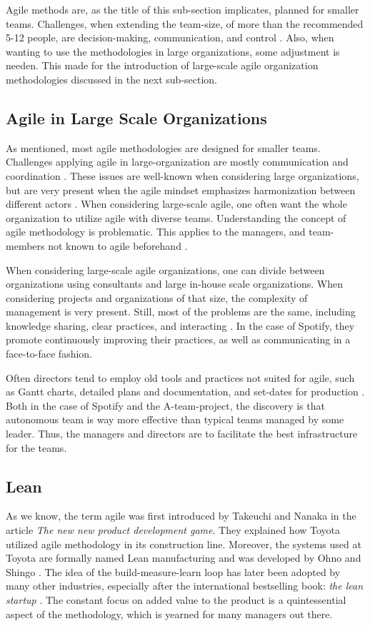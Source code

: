 Agile methods are, as the title of this sub-section implicates, planned for smaller teams. Challenges, when extending the team-size, of more than the recommended 5-12 people, are decision-making, communication, and control \cite{xu2009coordination}. Also, when wanting to use the methodologies in large organizations, some adjustment is needen. This made for the introduction of large-scale agile organization methodologies discussed in the next sub-section.  

\subsection{Agile in Large Scale Organizations}
As mentioned, most agile methodologies are designed for smaller teams. Challenges applying agile in large-organization are mostly communication and coordination \cite{dingsoyr2013research}. These issues are well-known when considering large organizations, but are very present when the agile mindset emphasizes harmonization between different actors \cite{miller2002harmonization}. 
When considering large-scale agile, one often want the whole organization to utilize agile with diverse teams. Understanding the concept of agile methodology is problematic. This applies to the managers, and team-members not known to agile beforehand \cite{svorstol2017tailoring}.

When considering large-scale agile organizations, one can divide between organizations using consultants and large in-house scale organizations. When considering projects and organizations of that size, the complexity of management is very present. Still, most of the problems are the same, including knowledge sharing, clear practices, and interacting \cite{smite2019spotify}. In the case of Spotify, they promote continuously improving their practices, as well as communicating in a face-to-face fashion.

Often directors tend to employ old tools and practices not suited for agile, such as Gantt charts, detailed plans and documentation, and set-dates for production \cite{benjaminsen2019}. Both in the case of Spotify and the A-team-project, the discovery is that autonomous team is way more effective than typical teams managed by some leader. Thus, the managers and directors are to facilitate the best infrastructure for the teams. 

\subsection{Lean}\label{sec:lean}
As we know, the term agile was first introduced by Takeuchi and Nanaka in the article \textit{The new new product development game}. They explained how Toyota utilized agile methodology in its construction line. Moreover, the systems used at Toyota are formally named Lean manufacturing and was developed by Ohno and Shingo \cite{becker1998lean}. The idea of the build-measure-learn loop has later been adopted by many other industries, especially after the international bestselling book: \textit{the lean startup} \cite{ries2011lean}. The constant focus on added value to the product is a quintessential aspect of the methodology, which is yearned for many managers out there. 

